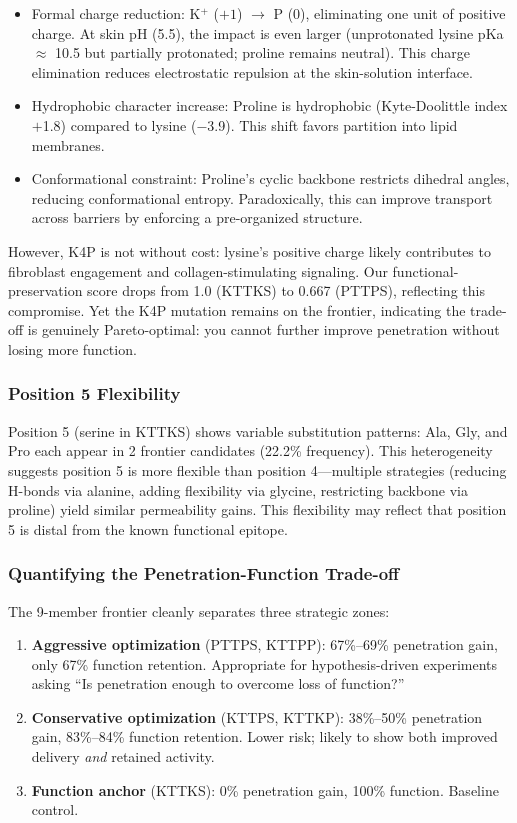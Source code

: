 \documentclass[11pt,a4paper]{article}
\begin{document}
\begin{itemize}
  \item Formal charge reduction: K$^+$ ($+1$) $\to$ P ($0$), eliminating one unit of positive charge. At skin pH (5.5), the impact is even larger (unprotonated lysine pKa $\approx$ 10.5 but partially protonated; proline remains neutral). This charge elimination reduces electrostatic repulsion at the skin-solution interface.
  \item Hydrophobic character increase: Proline is hydrophobic (Kyte-Doolittle index $+$1.8) compared to lysine ($-$3.9). This shift favors partition into lipid membranes.
  \item Conformational constraint: Proline's cyclic backbone restricts dihedral angles, reducing conformational entropy. Paradoxically, this can improve transport across barriers by enforcing a pre-organized structure.
\end{itemize}

However, K4P is not without cost: lysine's positive charge likely contributes to fibroblast engagement and collagen-stimulating signaling. Our functional-preservation score drops from 1.0 (KTTKS) to 0.667 (PTTPS), reflecting this compromise. Yet the K4P mutation remains on the frontier, indicating the trade-off is genuinely Pareto-optimal: you cannot further improve penetration without losing more function.

\subsubsection{Position 5 Flexibility}

Position 5 (serine in KTTKS) shows variable substitution patterns: Ala, Gly, and Pro each appear in 2 frontier candidates (22.2\% frequency). This heterogeneity suggests position 5 is more flexible than position 4---multiple strategies (reducing H-bonds via alanine, adding flexibility via glycine, restricting backbone via proline) yield similar permeability gains. This flexibility may reflect that position 5 is distal from the known functional epitope.

\subsubsection{Quantifying the Penetration-Function Trade-off}

The 9-member frontier cleanly separates three strategic zones:

\begin{enumerate}
  \item \textbf{Aggressive optimization} (PTTPS, KTTPP): 67\%--69\% penetration gain, only 67\% function retention. Appropriate for hypothesis-driven experiments asking ``Is penetration enough to overcome loss of function?''
  \item \textbf{Conservative optimization} (KTTPS, KTTKP): 38\%--50\% penetration gain, 83\%--84\% function retention. Lower risk; likely to show both improved delivery \textit{and} retained activity.
  \item \textbf{Function anchor} (KTTKS): 0\% penetration gain, 100\% function. Baseline control.
\end{enumerate}
\end{document}
